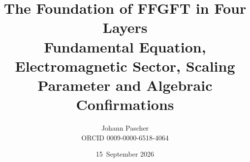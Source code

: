 \documentclass[11pt,a4paper]{report}
\title{The Foundation of FFGFT in Four Layers\\[0.5em]\large Fundamental Equation, Electromagnetic Sector, Scaling Parameter and Algebraic Confirmations}
\date{15~September 2026}
\author{Johann Pascher\\\small ORCID 0009-0000-6518-4064}
\begin{document}
\renewcommand{\thechapter}{}
\renewcommand{\thesection}{\arabic{section}}
\maketitle
\tableofcontents

\end{document}
